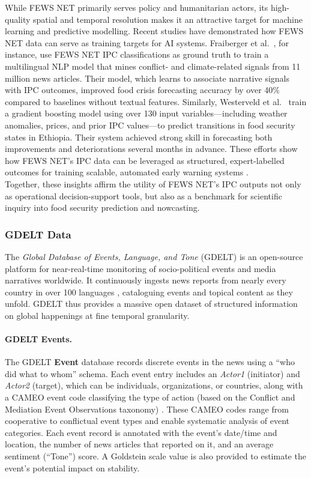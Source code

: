 \documentclass{article}
\begin{document}
While FEWS NET primarily serves policy and humanitarian actors, its high-quality spatial and temporal resolution makes it an attractive target for machine learning and predictive modelling. Recent studies have demonstrated how FEWS NET data can serve as training targets for AI systems. Fraiberger et al.~\citep{Fraiberger2023}, for instance, use FEWS NET IPC classifications as ground truth to train a multilingual NLP model that mines conflict- and climate-related signals from 11 million news articles. Their model, which learns to associate narrative signals with IPC outcomes, improved food crisis forecasting accuracy by over 40\% compared to baselines without textual features. Similarly, Westerveld et al.~\citep{westerveld2021forecasting} train a gradient boosting model using over 130 input variables—including weather anomalies, prices, and prior IPC values—to predict transitions in food security states in Ethiopia. Their system achieved strong skill in forecasting both improvements and deteriorations several months in advance. These efforts show how FEWS NET’s IPC data can be leveraged as structured, expert-labelled outcomes for training scalable, automated early warning systems \citep{michelson2023mlfs}.\\

Together, these insights affirm the utility of FEWS NET’s IPC outputs not only as operational decision-support tools, but also as a benchmark for scientific inquiry into food security prediction and nowcasting.

\subsubsection{GDELT Data}

The \textit{Global Database of Events, Language, and Tone} (GDELT) is an open-source platform for near-real-time monitoring of socio-political events and media narratives worldwide. It continuously ingests news reports from nearly every country in over 100 languages \citep{gdeltproject,leetaru2013gdelt}, cataloguing events and topical content as they unfold. GDELT thus provides a massive open dataset of structured information on global happenings at fine temporal granularity.

\paragraph{GDELT Events.}
The GDELT \textbf{Event} database records discrete events in the news using a “who did what to whom” schema. Each event entry includes an \textit{Actor1} (initiator) and \textit{Actor2} (target), which can be individuals, organizations, or countries, along with a CAMEO event code classifying the type of action (based on the Conflict and Mediation Event Observations taxonomy) \citep{leetaru2013gdelt}. These CAMEO codes range from cooperative to conflictual event types and enable systematic analysis of event categories. Each event record is annotated with the event’s date/time and location, the number of news articles that reported on it, and an average sentiment (“Tone”) score. A Goldstein scale value is also provided to estimate the event’s potential impact on stability.
\end{document}
